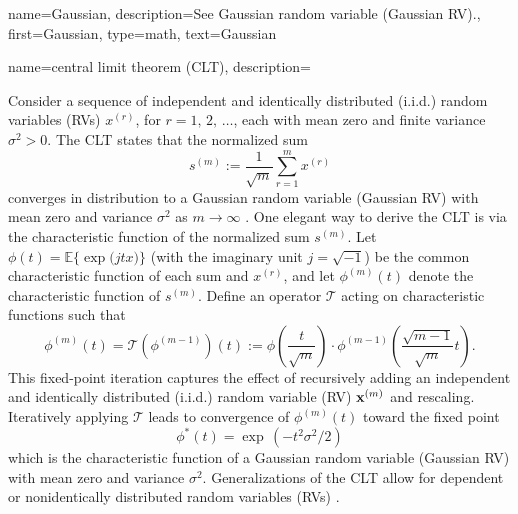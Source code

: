 { 
{name={Gaussian}, 
 description={See Gaussian random variable (Gaussian RV).},
 first={Gaussian},
 type=math,
 text={Gaussian}
 }
	
{name={central limit theorem (CLT)},
	description={Consider a sequence of independent and identically distributed (i.i.d.) random variables (RVs) \( x^{(r)} \), for \( r = 1, \,2, \,\ldots \), 
		each with mean zero and finite variance \( \sigma^2 > 0 \). 
		The  CLT states that the normalized sum 
		\[
		s^{(m)} := \frac{1}{\sqrt{m}} \sum_{r = 1}^{m} x^{(r)} 
		\]
		converges in distribution to a Gaussian random variable (Gaussian RV) with mean zero and variance \( \sigma^2 \) as \( m \to \infty \) \cite[Proposition~2.17]{AsympVanderVaartBook}.
		One elegant way to derive the CLT is via the characteristic function of the normalized sum \( s^{(m)} \). 
		Let $ \phi(t) = \mathbb{E}  \big\{ \exp \big( j t x \big) \big\}$ (with the imaginary unit $j = \sqrt{-1}$) 
		be the common characteristic function of each sum and $x^{(r)}$, and let \( \phi^{(m)}(t) \) 
		denote the characteristic function of \( s^{(m)} \). Define an operator \( \mathcal{T} \) acting on characteristic functions 
		such that
		\[
		\phi^{(m)}(t) = \mathcal{T}(\phi^{(m-1)})(t) := \phi\left( \frac{t}{\sqrt{m}} \right) \cdot \phi^{(m-1)}\left( \frac{\sqrt{m-1}}{\sqrt{m}} t \right).
		\]
		This fixed-point iteration captures the effect of recursively adding an independent and identically distributed (i.i.d.) random variable (RV) ${\bf x}^{(m)}$ 
		and rescaling. Iteratively applying \( \mathcal{T} \) leads to convergence of \( \phi^{(m)}(t) \) toward the fixed point
		\[
		\phi^*(t) = \exp\,(-t^2 \sigma^2 / 2)
		\]
		which is the characteristic function of a Gaussian random variable (Gaussian RV) with mean zero and variance 
		\( \sigma^2 \). Generalizations of the CLT allow for dependent or nonidentically distributed random variables (RVs) \cite[Sec.~2.8]{AsympVanderVaartBook}.
		\begin{figure}[H]
			\centering
\end{figure}}}}

